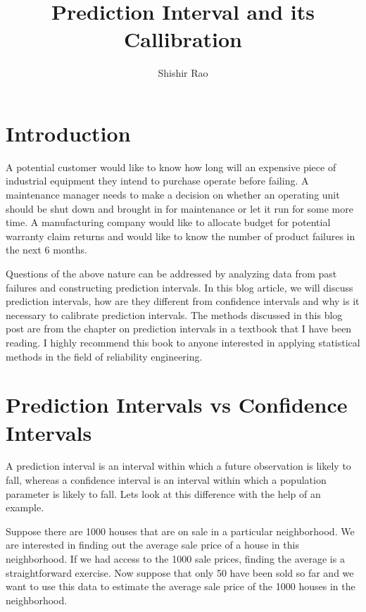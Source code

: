 \documentclass[
  letterpaper,
  DIV=11,
  numbers=noendperiod,
  oneside]{scrartcl}
\title{Prediction Interval and its Callibration}
\author{Shishir Rao}
\date{}
\begin{document}
\maketitle


\section{Introduction}\label{introduction}

A potential customer would like to know how long will an expensive piece
of industrial equipment they intend to purchase operate before failing.
A maintenance manager needs to make a decision on whether an operating
unit should be shut down and brought in for maintenance or let it run
for some more time. A manufacturing company would like to allocate
budget for potential warranty claim returns and would like to know the
number of product failures in the next 6 months.

Questions of the above nature can be addressed by analyzing data from
past failures and constructing prediction intervals. In this blog
article, we will discuss prediction intervals, how are they different
from confidence intervals and why is it necessary to calibrate
prediction intervals. The methods discussed in this blog post are from
the chapter on prediction intervals in a textbook that I have been reading. I highly
recommend this book to anyone interested in applying statistical methods
in the field of reliability engineering.

\section{Prediction Intervals vs Confidence
Intervals}\label{prediction-intervals-vs-confidence-intervals}

A prediction interval is an interval within which a future observation
is likely to fall, whereas a confidence interval is an interval within
which a population parameter is likely to fall. Lets look at this
difference with the help of an example.

Suppose there are 1000 houses that are on sale in a particular
neighborhood. We are interested in finding out the average sale price of
a house in this neighborhood. If we had access to the 1000 sale prices,
finding the average is a straightforward exercise. Now suppose that only
50 have been sold so far and we want to use this data to estimate the
average sale price of the 1000 houses in the neighborhood.
\end{document}
